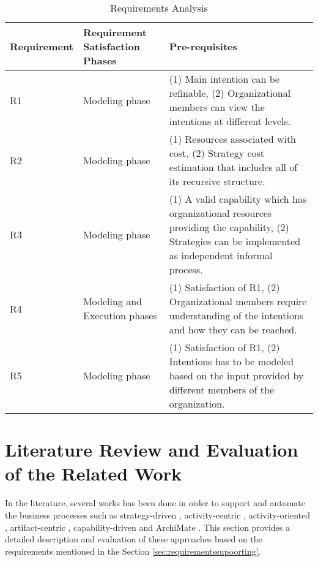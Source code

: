 \begin{table} [htbp]
	\centering
	\begin{tabular} {p{2.5cm}p{3cm}p{8cm}}
		\toprule
		\textbf{Requirement} & \textbf{Requirement Satisfaction Phases} & \textbf{Pre-requisites}    \\
		\midrule                                                                                                               
		R1    & Modeling phase    &(1) Main intention can be refinable, (2) Organizational members can view the intentions at different levels.    \\ 
		
		R2   & Modeling phase    &(1) Resources associated with cost, (2) Strategy cost estimation that includes all of its recursive structure. \\         
			
		R3   & Modeling phase       &(1) A valid capability which has organizational resources providing the capability, (2) Strategies can be implemented as independent informal process. \\      
		
		R4   & Modeling and Execution phases     &(1) Satisfaction of R1, (2) Organizational members require understanding of the intentions and how they can be reached. \\                         
			
		R5  &Modeling phase  &(1) Satisfaction of R1, (2) Intentions has to be modeled based on the input provided by different members of the organization.               \\ 
		    
		\bottomrule
	\end{tabular}
	\caption{Requirements Analysis}
	\label{tab:subrequirements}
\end{table}

\section{Literature Review and Evaluation of the Related Work}
\label{sec:literaturereview}
In the literature, several works has been done in order to support and automate the business processes such as strategy-driven  \cite{Bider2005}, activity-centric \cite{Yarosh2009}, activity-oriented \cite{Leymann2000}, artifact-centric \cite{Cohn2009}, capability-driven \cite{Stirna2012} and ArchiMate \cite{Group2012}. This section provides a detailed description and evaluation of these approaches based on the requirements mentioned in the Section \ref{sec:requirementssupoorting}. 

